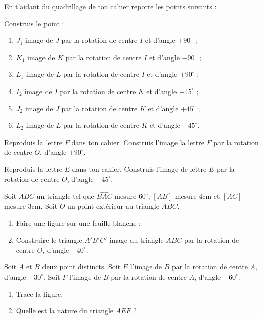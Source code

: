 \begin{exercice}
En t'aidant du quadrillage de ton cahier reporte les points suivants :
\begin{center}  \end{center}
Construis le point :
\begin{enumerate}
 \item $J_1$ image de $J$ par la rotation de centre $I$ et d’angle $+ 90^\circ$ ;
 \item $K_1$ image de $K$ par la rotation de centre $I$ et d’angle $- 90^\circ$ ;
 \item $L_1$ image de $L$ par la rotation de centre $I$ et d’angle $+ 90^\circ$ ;
 \item $I_2$ image de $I$ par la rotation de centre $K$ et d’angle $- 45^\circ$ ;
 \item $J_2$ image de $J$ par la rotation de centre $K$ et d’angle $+ 45^\circ$ ;
 \item $L_2$ image de $L$ par la rotation de centre $K$ et d’angle $- 45^\circ$.
 \end{enumerate}
\end{exercice}


\begin{exercice}
Reproduis la lettre $F$ dans ton cahier. Construis l'image la lettre $F$ par la rotation de centre $O$, d'angle $+ 90^\circ$.
\begin{center}  \end{center}
\end{exercice}


\begin{exercice}
Reproduis la lettre $E$ dans ton cahier. Construis l'image de lettre $E$ par la rotation de centre $O$, d'angle $- 45^\circ$.
\begin{center}  \end{center}
\end{exercice}


\begin{exercice}
Soit $ABC$ un triangle tel que $\widehat{BAC}$ mesure $60^\circ$; $[AB]$ mesure 4cm et $[AC]$ mesure 3cm. Soit $O$ un point extérieur au triangle $ABC$.
\begin{enumerate}
 \item Faire une figure sur une feuille blanche ;
 \item Construire le triangle $A'B'C'$ image du triangle $ABC$ par la rotation de centre $O$, d'angle $+ 40^\circ$.
 \end{enumerate}
\end{exercice}


\begin{exercice}
Soit $A$ et $B$ deux point distincts. Soit $E$ l'image de $B$ par la rotation de centre $A$, d'angle $+ 30^\circ$. Soit $F$ l'image de $B$ par la rotation de centre $A$, d'angle $- 60^\circ$.
\begin{enumerate}
 \item Trace la figure.
 \item Quelle est la nature du triangle $AEF$ ?
 \end{enumerate}
\end{exercice}

